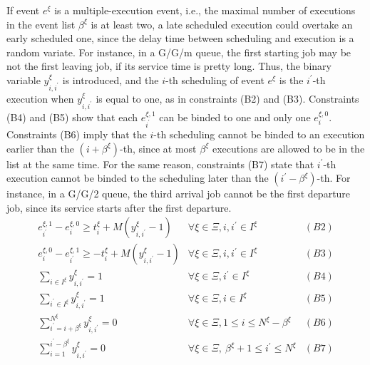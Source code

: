 \documentclass[]{interact}
\theoremstyle{plain}%
\theoremstyle{definition}
\theoremstyle{remark}
\begin{document}
If event $e^{\xi}$ is a multiple-execution event, i.e., the maximal number of executions in the event list $\beta^{\xi}$ is at least two, a late scheduled execution could overtake an early scheduled one, since the delay time between scheduling and execution is a random variate. For instance, in a G/G/m queue, the first starting job may be not the first leaving job, if its service time is pretty long. Thus, the binary variable $y^{\xi}_{i,i^{'}}$ is introduced, and the $i$-th scheduling of event $e^{\xi}$ is the $i^{'}$-th execution when $y^{\xi}_{i,i^{'}}$ is equal to one, as in constraints (B2) and (B3). Constraints (B4) and (B5) show that each $e^{\xi,1}_{i^{'}}$ can be binded to one and only one $e^{\xi,0}_{i}$. Constraints (B6) imply that the $i$-th scheduling cannot be binded to an execution earlier than the $(i+\beta^{\xi})$-th, since at most $\beta^{\xi}$ executions are allowed to be in the list at the same time. For the same reason, constraints (B7) state that $i^{'}$-th execution cannot be binded to the scheduling later than the $(i^{'}-\beta^{\xi})$-th. For instance, in a G/G/2 queue, the third arrival job cannot be the first departure job, since its service starts after the first departure.
\begin{eqnarray}
e^{\xi,1}_{i^{'}} - e^{\xi,0}_{i} \ge t^{\xi}_{i} +M(y^{\xi}_{i,i^{'}}-1) & \forall \xi\in\Xi, i, i ^{'}\in I^{\xi}&(B2)\nonumber\\
e^{\xi,0}_{i} - e^{\xi,1}_{i^{'}}  \ge -t^{\xi}_{i} +M(y^{\xi}_{i,i^{'}}-1) &  \forall \xi\in\Xi, i, i ^{'}\in I^{\xi}&(B3)\nonumber\\
\sum_{i\in I^{\xi}} y^{\xi}_{i,i^{'}} = 1										&  \forall \xi\in\Xi, i ^{'}\in I^{\xi} &(B4)\nonumber\\
\sum_{i^{'}\in I^{\xi}} y^{\xi}_{i,i^{'}} = 1 									& \forall \xi\in\Xi, i \in I^{\xi}&(B5)\nonumber\\
\sum_{i^{'}=i+\beta^{\xi}}^{N^{\xi}} y^{\xi}_{i,i^{'}}=0					&  \forall \xi\in\Xi, 1\le i\le N^{\xi}-\beta^{\xi}&(B6)\nonumber\\
\sum_{i=1}^{i^{'}-\beta^{\xi}} y^{\xi}_{i,i^{'}}=0							& \forall \xi\in\Xi,\ \beta^{\xi}+1\le i^{'} \le N^{\xi}&(B7)\nonumber
\end{eqnarray}
\end{document}
